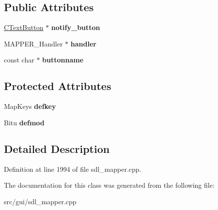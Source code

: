 \subsection*{Public Attributes}
\begin{DoxyCompactItemize}
\item 
\hypertarget{classCHandlerEvent_ac636235e80032332d688fe888ebd5cf4}{\hyperlink{classCTextButton}{C\-Text\-Button} $\ast$ {\bfseries notify\-\_\-button}}\label{classCHandlerEvent_ac636235e80032332d688fe888ebd5cf4}

\item 
\hypertarget{classCHandlerEvent_a9227a65125fadc33d775cc0de3b29393}{M\-A\-P\-P\-E\-R\-\_\-\-Handler $\ast$ {\bfseries handler}}\label{classCHandlerEvent_a9227a65125fadc33d775cc0de3b29393}

\item 
\hypertarget{classCHandlerEvent_a935a8c622ac72d46512f5c88fefacda8}{const char $\ast$ {\bfseries buttonname}}\label{classCHandlerEvent_a935a8c622ac72d46512f5c88fefacda8}

\end{DoxyCompactItemize}
\subsection*{Protected Attributes}
\begin{DoxyCompactItemize}
\item 
\hypertarget{classCHandlerEvent_a7d53624253497b7dcad4a281a790333d}{Map\-Keys {\bfseries defkey}}\label{classCHandlerEvent_a7d53624253497b7dcad4a281a790333d}

\item 
\hypertarget{classCHandlerEvent_a2ebc8142a6ef34d7c23349e86a0d4486}{Bitu {\bfseries defmod}}\label{classCHandlerEvent_a2ebc8142a6ef34d7c23349e86a0d4486}

\end{DoxyCompactItemize}


\subsection{Detailed Description}


Definition at line 1994 of file sdl\-\_\-mapper.\-cpp.



The documentation for this class was generated from the following file\-:\begin{DoxyCompactItemize}
\item 
src/gui/sdl\-\_\-mapper.\-cpp\end{DoxyCompactItemize}

